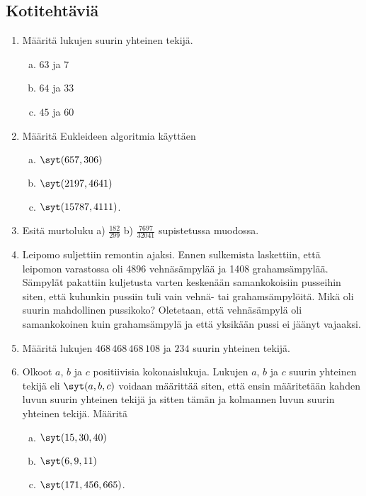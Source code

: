 
\subsection*{Kotitehtäviä}


\begin{enumerate}

\item Määritä lukujen suurin yhteinen tekijä.
\begin{enumerate}[a)]
\item $63$ ja $7$
\item $64$ ja $33$
\item $45$ ja $60$
\end{enumerate}

\item Määritä Eukleideen algoritmia käyttäen
\begin{enumerate}[a)]
\item $\syt(657,306)$
\item $\syt(2197,4641)$
\item $\syt(15787,4111)$.
\end{enumerate}

\item
Esitä murtoluku  a) $\frac{182}{299}$  b) $\frac{7697}{32041}$  supistetussa muodossa.

\item Leipomo suljettiin remontin ajaksi. Ennen sulkemista laskettiin, että leipomon varastossa oli 4896 vehnäsämpylää ja 1408 grahamsämpylää. Sämpylät pakattiin kuljetusta varten keskenään samankokoisiin pusseihin siten, että kuhunkin pussiin tuli vain vehnä- tai grahamsämpylöitä. Mikä oli suurin mahdollinen pussikoko? Oletetaan, että vehnäsämpylä oli samankokoinen kuin grahamsämpylä ja että yksikään pussi ei jäänyt vajaaksi.

\item Määritä lukujen $468\, 468\, 468\, 108$ ja $234$ suurin yhteinen tekijä.

\item Olkoot $a$, $b$ ja $c$ positiivisia kokonaislukuja. Lukujen $a$, $b$ ja $c$ suurin yhteinen tekijä eli $\syt(a,b,c)$ voidaan määrittää siten, että ensin määritetään kahden luvun suurin yhteinen tekijä ja sitten tämän ja kolmannen luvun suurin yhteinen tekijä. Määritä
\begin{enumerate}[a)]
\item $\syt(15,30,40)$
\item $\syt(6,9,11)$
\item $\syt(171,456,665)$.
\end{enumerate}


\end{enumerate}
